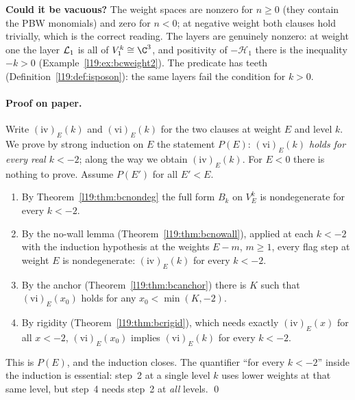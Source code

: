\begin{dictionary}
\textbf{Could it be vacuous?} The weight spaces are nonzero for $n\ge0$ (they contain the PBW monomials) and
zero for $n<0$; at negative weight both clauses hold trivially, which is the correct reading. The layers are
genuinely nonzero: at weight one the layer $\mathcal{L}_1$ is all of $V^k_1\cong\C^3$, and positivity of
$-\mathcal H_1$ there is the inequality $-k>0$ (Example~\ref{l19:ex:bcweight2}). The predicate  has teeth
(Definition~\ref{l19:def:isposon}): the same layers fail the condition for $k>0$.
\end{dictionary}

\paragraph{Proof on paper.} Write $\mathrm{(iv)}_E(k)$ and $\mathrm{(vi)}_E(k)$ for the two clauses at weight
$E$ and level $k$. We prove by strong induction on $E$ the statement $P(E)$: \emph{$\mathrm{(vi)}_E(k)$ holds for
every real $k<-2$}; along the way we obtain $\mathrm{(iv)}_E(k)$. For $E<0$ there is nothing to prove.
Assume $P(E')$ for all $E'<E$.
\begin{enumerate}
\item By Theorem~\ref{l19:thm:bcnondeg} the full form $B_k$ on $V^k_E$ is nondegenerate for every $k<-2$.
\item By the no-wall lemma (Theorem~\ref{l19:thm:bcnowall}), applied at each $k<-2$ with the induction hypothesis
  at the weights $E-m$, $m\ge1$, every flag step at weight $E$ is nondegenerate: $\mathrm{(iv)}_E(k)$ for every
  $k<-2$.
\item By the anchor (Theorem~\ref{l19:thm:bcanchor}) there is $K$ such that $\mathrm{(vi)}_E(x_0)$ holds for any
  $x_0<\min(K,-2)$.
\item By rigidity (Theorem~\ref{l19:thm:bcrigid}), which needs exactly $\mathrm{(iv)}_E(x)$ for all $x<-2$,
  $\mathrm{(vi)}_E(x_0)$ implies $\mathrm{(vi)}_E(k)$ for every $k<-2$.
\end{enumerate}
This is $P(E)$, and the induction closes. The quantifier ``for every $k<-2$'' inside the induction is essential:
step~2 at a single level $k$ uses lower weights at that same level, but step~4 needs step~2 at \emph{all} levels.
\qed

